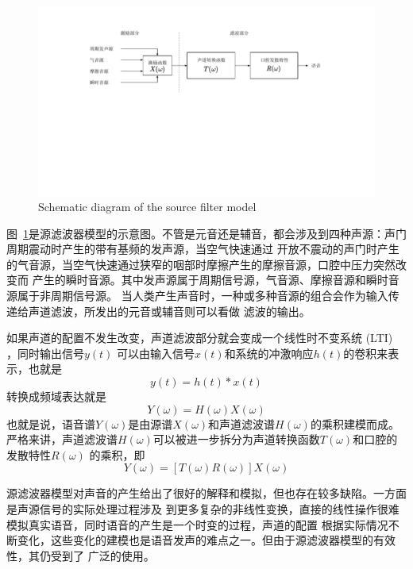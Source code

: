 \begin{figure}[!htp]
    \centering
    \includegraphics[width=13cm,trim=100 210 100 40,clip]{figure/2_sourcefilter.pdf}
    {Schematic diagram of the source filter model}
    \label{fig:sourcefilter}
\end{figure}

图~\ref{fig:sourcefilter}是源滤波器模型的示意图。不管是元音还是辅音，都会涉及到四种声源：声门周期震动时产生的带有基频的发声源，当空气快速通过
开放不震动的声门时产生的气音源，当空气快速通过狭窄的咽部时摩擦产生的摩擦音源，口腔中压力突然改变而
产生的瞬时音源。其中发声源属于周期信号源，气音源、摩擦音源和瞬时音源属于非周期信号源。
当人类产生声音时，一种或多种音源的组合会作为输入传递给声道滤波，所发出的元音或辅音则可以看做
滤波的输出。

如果声道的配置不发生改变，声道滤波部分就会变成一个线性时不变系统 (LTI) ，同时输出信号$y(t)$
可以由输入信号$x(t)$和系统的冲激响应$h(t)$的卷积来表示，也就是
\begin{equation}
    y(t) = h(t) * x(t)
\end{equation}
转换成频域表达就是
\begin{equation}
    Y(\omega) = H(\omega) X(\omega)
\end{equation}
也就是说，语音谱$Y(\omega)$是由源谱$X(\omega)$和声道滤波谱$H(\omega)$的乘积建模而成。
严格来讲，声道滤波谱$H(\omega)$可以被进一步拆分为声道转换函数$T(\omega)$和口腔的发散特性$R(\omega)$
的乘积，即
\begin{equation}
    Y(\omega) = [T(\omega)R(\omega)]X(\omega)
\end{equation}

源滤波器模型对声音的产生给出了很好的解释和模拟，但也存在较多缺陷。一方面是声源信号的实际处理过程涉及
到更多复杂的非线性变换，直接的线性操作很难模拟真实语音，同时语音的产生是一个时变的过程，声道的配置
根据实际情况不断变化，这些变化的建模也是语音发声的难点之一。但由于源滤波器模型的有效性，其仍受到了
广泛的使用。


